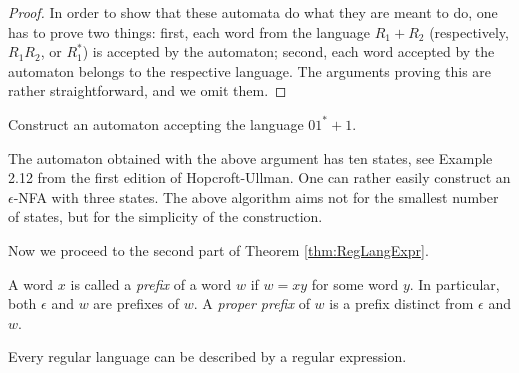 \begin{page}
\begin{proof}
In order to show that these automata do what they are meant to do, one has to prove two things:
first, each word from the language $R_1 + R_2$ (respectively, $R_1R_2$, or $R_1^*$) is accepted by the automaton;
second, each word accepted by the automaton belongs to the respective language.
The arguments proving this are rather straightforward, and we omit them.
\end{proof}


\end{page}

\begin{page}

\begin{exl}
Construct an automaton accepting the language $01^* + 1$.

The automaton obtained with the above argument has ten states, see Example 2.12 from the first edition of Hopcroft-Ullman.
One can rather easily construct an $\epsilon$-NFA with three states.
The above algorithm aims not for the smallest number of states, but for the simplicity of the construction.
\end{exl}

\end{page}

\begin{page}


Now we proceed to the second part of Theorem \ref{thm:RegLangExpr}.


\end{page}

\begin{page}

\begin{dfn}
A word $x$ is called a \emph{prefix} of a word $w$ if $w = xy$ for some word $y$.
In particular, both $\epsilon$ and $w$ are prefixes of $w$.
A \emph{proper prefix} of $w$ is a prefix distinct from $\epsilon$ and $w$.
\end{dfn}

\end{page}

\begin{page}

\begin{lem}
Every regular language can be described by a regular expression.
\end{lem}

\end{page}

